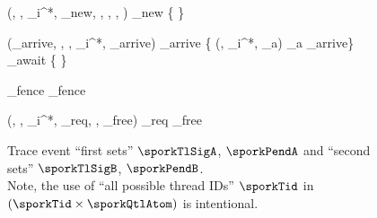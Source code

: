 \begin{figure}[h]
\codehrule
\centering
\vertexDiagram
  {\sporkTrNewAccess(\sporkmut, \sporkx, \sporkz_i^*, \sporkTid_\textrm{new}, \sporkqtlInit, \sporkQtlAtom, \sporkQtlMask, \sporkPendAwait)}
  {}
  {\sporkTid_\textrm{new} \times \{ \sporkqtlInit \} \cup \sporkTid \times \sporkQtlAtom}
  {}
  {\sporkPendAwait}

\medskip
\vertexDiagram
  {\sporkTrArrive(\sporkTid_\textrm{arrive}, \sporkQtlArrive, \sporkx, \sporkz_i^*, \sporkz_\textrm{arrive})}
  {\sporkTid_\textrm{arrive} \times \sporkQtlArrive}
  {}
  {}
  {\{ \sporkPendingAwait(\sporkx, \sporkz_i^*, \sporkz_a) \mid \sporkz_a \ge \sporkz_\textrm{arrive}\}}
\hfill
{}
  {}
  {\sporkTid_\textrm{await} \times \sporkQtlAwait}
  {\{ \sporkpend \}}
  {}

\vspace{-8pt} %
  {\sporkTid_\textrm{fence} \times \sporkQtlArrive}
  {\sporkTid_\textrm{fence} \times \sporkQtlAwait}
  {}
  {}

\medskip
\vspace{-5pt}
\vertexDiagramSides
  {\sporkTrReqCanAccess(\sporkmut, \sporkx, \sporkz_i^*, \sporkTid_\textrm{req}, \sporkQtlPre, \sporkPend_\textrm{free})}
  {\sporkTid_\textrm{req} \times \sporkQtlPre}
  {}
  {\sporkPend_\textrm{free}}
  {}
\caption{Trace event ``first sets'' $\sporkTlSigA$, $\sporkPendA$ and ``second sets'' $\sporkTlSigB$, $\sporkPendB$.\\
Note, the use of ``all possible thread IDs'' $\sporkTid$ in $(\sporkTid \times \sporkQtlAtom)$ is intentional.}
\label{fig:VertexTable}  %
\codehrule
\end{figure}
